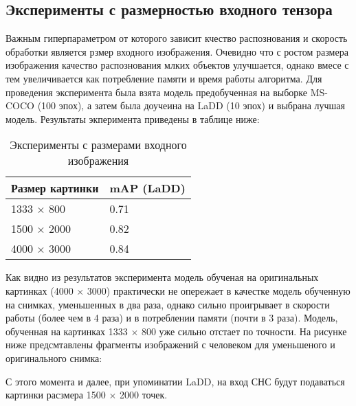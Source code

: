 \subsection{Эксперименты с размерностью входного тензора}

Важным гиперпараметром от которого зависит кчество распознования и скорость обработки является рзмер входного изображения. Очевидно что с ростом размера изображения качество распознования млких объектов улучшается, однако вмесе с тем увеличивается как потребление памяти и время работы алгоритма. Для проведения эксперимента была взята модель предобученная на выборке MS-COCO (100 эпох), а затем была доучеина на LaDD (10 эпох) и выбрана лучшая модель. Результаты экперимента приведены в таблице ниже:

\begin{table}[H]
    \caption{Эксперименты с размерами входного изображения}\label{image-size-table}
    \begin{tabular}{|p{7cm}|p{5cm}|}
        \hline
        {Размер картинки} & {mAP (LaDD)} \\
        \hline
        1333 $\times$ 800 & 0.71 \\
        \hline
        1500 $\times$ 2000 & 0.82 \\
        \hline
        4000 $\times$ 3000 & 0.84 \\
        \hline
    \end{tabular}
\end{table}

Как видно из результатов эксперимента модель обученая на оригинальных картинках (4000 $\times$ 3000) практически не опережает в качестке модель обученную на снимках, уменьшенных в два раза, однако сильно проигрывает в скорости работы (более чем в 4 раза) и в потреблении памяти (почти в 3 раза). Модель, обученная на картинках 1333 $\times$ 800 уже сильно отстает по точности. На рисунке ниже предсмтавлены фрагменты изображений с человеком для уменьшеного и оригинального снимка:


С этого момента и далее, при упоминатии LaDD, на вход СНС будут подаваться картинки расзмера 1500 $\times$ 2000 точек.